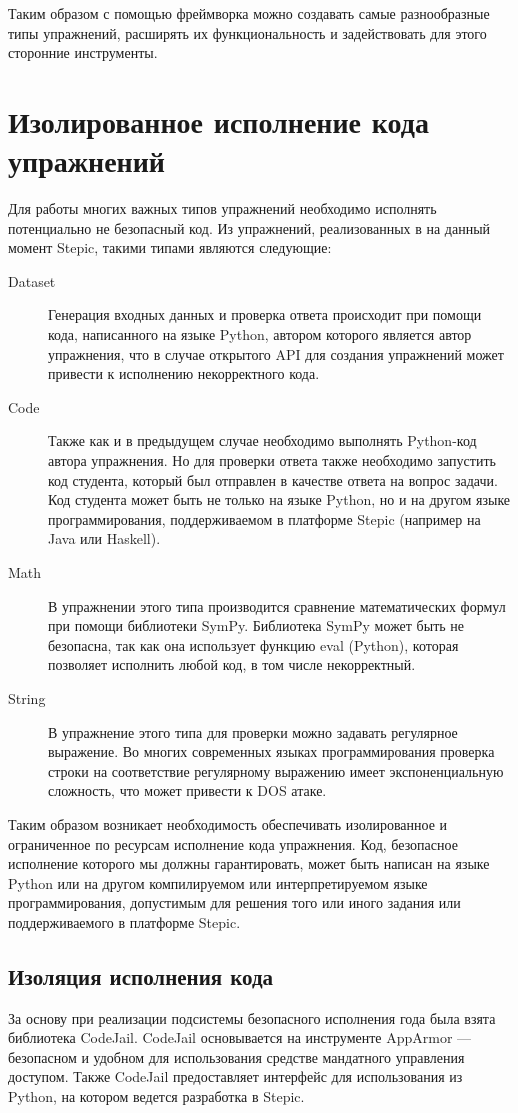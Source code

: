 \documentclass{matmex-diploma-custom}
\begin{document}
Таким образом с помощью фреймворка можно создавать самые разнообразные
типы упражнений, расширять их функциональность и задействовать для
этого сторонние инструменты.

\section{Изолированное исполнение кода упражнений}

Для работы многих важных типов упражнений необходимо исполнять
потенциально не безопасный код. Из упражнений, реализованных в на
данный момент Stepic, такими типами являются следующие:
\begin{description}
\item[Dataset] Генерация входных данных и проверка ответа происходит
  при помощи кода, написанного на языке Python, автором которого
  является автор упражнения, что в случае открытого API для создания
  упражнений может привести к исполнению некорректного кода.
\item[Code] Также как и в предыдущем случае необходимо выполнять
  Python-код автора упражнения. Но для проверки ответа также
  необходимо запустить код студента, который был отправлен в качестве
  ответа на вопрос задачи. Код студента может быть не только на языке
  Python, но и на другом языке программирования, поддерживаемом в
  платформе Stepic (например на Java или Haskell).
\item[Math] В упражнении этого типа производится сравнение
  математических формул при помощи библиотеки SymPy. Библиотека SymPy
  может быть не безопасна, так как она использует функцию eval
  (Python), которая позволяет исполнить любой код, в том числе
  некорректный.
\item[String] В упражнение этого типа для проверки можно задавать
  регулярное выражение. Во многих современных языках программирования
  проверка строки на соответствие регулярному выражению имеет
  экспоненциальную сложность, что может привести к DOS атаке.
\end{description}

Таким образом возникает необходимость обеспечивать изолированное и
ограниченное по ресурсам исполнение кода упражнения. Код, безопасное
исполнение которого мы должны гарантировать, может быть написан на
языке Python или на другом компилируемом или интерпретируемом языке
программирования, допустимым для решения того или иного задания или
поддерживаемого в платформе Stepic.

\subsection{Изоляция исполнения кода}
За основу при реализации подсистемы безопасного исполнения года была
взята библиотека CodeJail. CodeJail основывается на инструменте
AppArmor --- безопасном \cite{Bauer} и удобном для использования
\cite{Schreuders} средстве мандатного управления доступом. Также
CodeJail предоставляет интерфейс для использования из Python, на
котором ведется разработка в Stepic.
\end{document}
